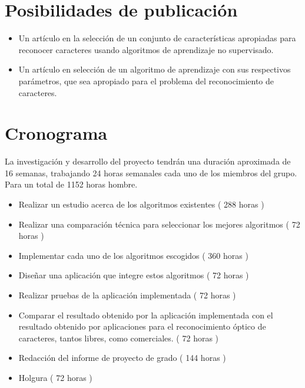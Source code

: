 \documentclass[a4paper, 11pt, oneside]{article}
\begin{document}
	\section{Posibilidades de publicación}
	\begin{itemize}
		\item Un artículo en la selección de un conjunto de características apropiadas para reconocer caracteres usando algoritmos de aprendizaje
		no supervisado.
		\item Un artículo en selección de un algoritmo de aprendizaje con sus respectivos parámetros, que sea apropiado para el problema
		del reconocimiento de caracteres.
	\end{itemize}
	
	\clearpage
	
	\section{Cronograma}
	La investigación y desarrollo del proyecto tendrán una duración aproximada de 16 semanas,
	trabajando 24 horas semanales cada uno de los miembros del grupo. Para un total de 1152
	horas hombre.
	\begin{itemize}
	\item Realizar un estudio acerca de los algoritmos existentes ( 288 horas )
	\item Realizar una comparación técnica para seleccionar los mejores algoritmos ( 72 horas )
	\item Implementar cada uno de los algoritmos escogidos ( 360 horas )
	\item Diseñar una aplicación que integre estos algoritmos ( 72 horas )
	\item Realizar pruebas de la aplicación implementada ( 72 horas )
	\item Comparar el resultado obtenido por la aplicación implementada con el resultado obtenido por aplicaciones para el reconocimiento óptico de caracteres, tantos libres, como comerciales. ( 72 horas )
	\item Redacción del informe de proyecto de grado ( 144 horas )
	\item Holgura ( 72 horas )
	\end{itemize}
	\clearpage
	


\nocite{*}
\end{document}
